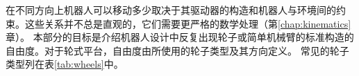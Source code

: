 在不同方向上机器人可以移动多少取决于其驱动器的构造和机器人与环境间的约束。这些关系并不总是直观的，它们需要更严格的数学处理（第\ref{chap:kinematics}章）。 本部分的目标是介绍机器人设计中反复出现轮子或简单机械臂的标准构造的自由度。对于轮式平台，自由度由所使用的轮子类型及其方向定义。 常见的轮子类型列在表\ref{tab:wheels}中。


